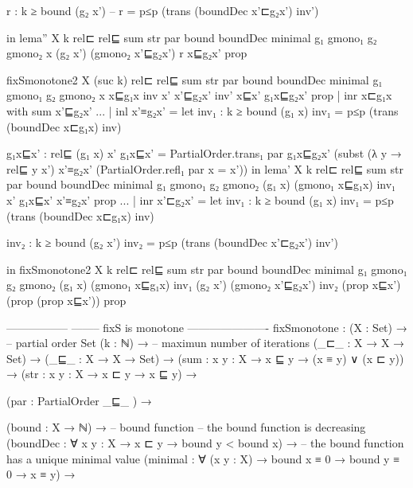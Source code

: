                                      r :  k ≥ bound (g₂ x') -- 
                                     r = p≤p (trans (boundDec x'⊏g₂x') inv')
                                     
                                 in  lema'' X k rel⊏ rel⊑ sum str par bound boundDec minimal g₁
                                   gmono₁ g₂ gmono₂ x (g₂ x') (gmono₂ x'⊑g₂x') r x⊑g₂x' prop
                                   
fixSmonotone2 X (suc k) rel⊏  rel⊑ sum str par bound boundDec minimal g₁ gmono₁ g₂ gmono₂ x 
         x⊑g₁x inv x' x'⊑g₂x' inv' x⊑x' g₁x⊑g₂x' prop | inr x⊏g₁x with sum x'⊑g₂x'
... | inl x'≡g₂x' =  let   inv₁ : k ≥ bound (g₁ x)
                           inv₁ = p≤p (trans (boundDec x⊏g₁x) inv)
                           
                           g₁x⊑x' :  rel⊑ (g₁ x) x'
                           g₁x⊑x' = PartialOrder.trans₁ par g₁x⊑g₂x' (subst (λ y → rel⊑ y x') x'≡g₂x'
                                     (PartialOrder.refl₁ par {x = x'}))
                      in lema' X k rel⊏ rel⊑ sum str par bound boundDec minimal g₁
                               gmono₁ g₂ gmono₂ (g₁ x) (gmono₁ x⊑g₁x) inv₁ x' g₁x⊑x' x'≡g₂x' prop 
... | inr x'⊏g₂x' =  let inv₁ : k ≥ bound (g₁ x)
                         inv₁ = p≤p (trans (boundDec x⊏g₁x) inv)

                         inv₂ : k ≥ bound (g₂ x')
                         inv₂ = p≤p (trans (boundDec x'⊏g₂x') inv') 

                     in fixSmonotone2 X k rel⊏ rel⊑ sum str par bound boundDec
                      minimal g₁ gmono₁ g₂ gmono₂ (g₁ x) (gmono₁ x⊑g₁x) inv₁ (g₂ x')
                      (gmono₂ x'⊑g₂x') inv₂ (prop x⊑x') (prop (prop x⊑x')) prop



-----------------
-------- fixS is monotone
----------------------
fixSmonotone :  (X : Set) →    -- partial order Set
       (k : ℕ) →               -- maximun number of iterations
       (_⊏_ : X → X → Set) →
       (_⊑_ : X → X → Set) →  
       (sum : {x y : X} → x ⊑ y → (x ≡ y) ∨ (x ⊏ y)) →   
       (str : {x y : X} → x ⊏ y → x ⊑ y) →

       (par : PartialOrder _⊑_ ) →    
       
       (bound : X → ℕ) →      -- bound function 
       -- the bound function is decreasing 
       (boundDec : ∀ {x y : X} → x ⊏ y → bound y < bound x) →  
       -- the bound function has a unique minimal value
       (minimal : ∀ (x y : X) → bound x ≡ 0 → bound y ≡ 0 → x ≡ y) → 

